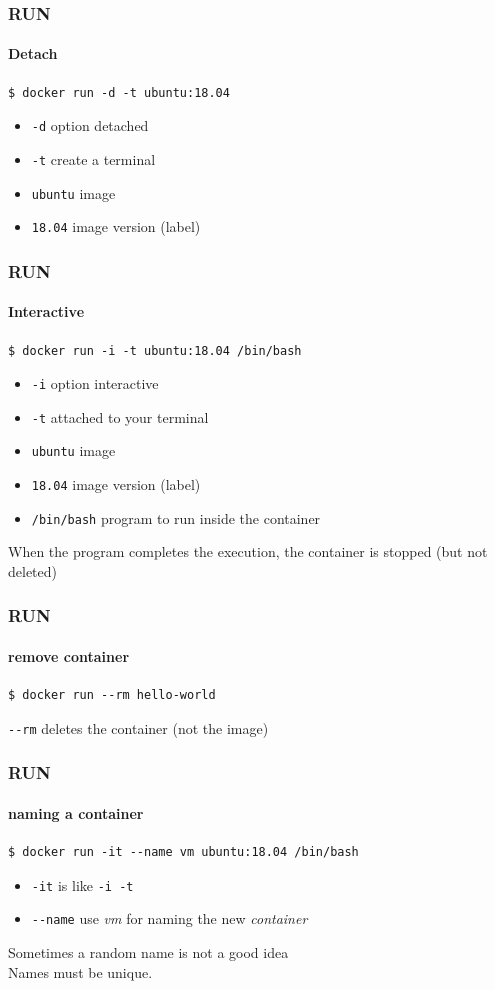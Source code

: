 \begin{frame}[fragile]
\frametitle{RUN}
\framesubtitle{Detach}
\begin{lstlisting}
$ docker run -d -t ubuntu:18.04
\end{lstlisting}

\begin{itemize}
\item \lstinline!-d! option detached
\item \lstinline!-t! create a terminal
\item \lstinline!ubuntu! image
\item \lstinline!18.04! image version (label)
\end{itemize}
\end{frame}

\begin{frame}[fragile]
\frametitle{RUN}
\framesubtitle{Interactive}
\begin{lstlisting}
$ docker run -i -t ubuntu:18.04 /bin/bash
\end{lstlisting}

\begin{itemize}
\item \lstinline!-i! option interactive
\item \lstinline!-t! attached to your terminal
\item \lstinline!ubuntu! image
\item \lstinline!18.04! image version (label)
\item \lstinline!/bin/bash! program to run inside the container
\end{itemize}
When the program completes the execution, the container is stopped (but not deleted)
\end{frame}

\begin{frame}[fragile]
\frametitle{RUN}
\framesubtitle{remove container}
\begin{lstlisting}
$ docker run --rm hello-world
\end{lstlisting}
\lstinline!--rm! deletes the container (not the image)
\end{frame} 
 
\begin{frame}[fragile]
\frametitle{RUN}
\framesubtitle{naming a container}
\begin{lstlisting}
$ docker run -it --name vm ubuntu:18.04 /bin/bash
\end{lstlisting}

\begin{itemize}
\item \lstinline!-it! is like \lstinline!-i -t!
\item \lstinline!--name! use \textit{vm} for naming the new \textit{container}
\end{itemize}
Sometimes a random name is not a good idea\\
Names must be unique.
\end{frame}

